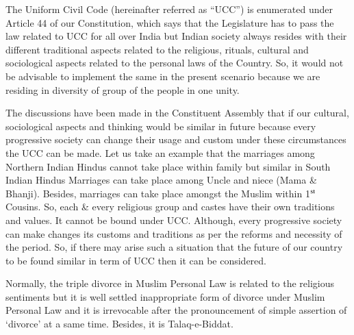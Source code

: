 \setcounter{figure}{0}
\setcounter{table}{0}
\setcounter{footnote}{0}




\begin{multicols}{2}


\noi
The Uniform Civil Code (hereinafter referred as “UCC”) is enumerated under Article 44 of
our Constitution, which says that the Legislature has to pass the law related to UCC for all
over India but Indian society always resides with their different traditional aspects related to
the religious, rituals, cultural and sociological aspects related to the personal laws of the
Country. So, it would not be advisable to implement the same in the present scenario because
we are residing in diversity of group of the people in one unity.

\vspace{-.1cm}

\noi
The discussions have been made in the Constituent Assembly that if our cultural, sociological
aspects and thinking would be similar in future because every progressive society can change
their usage and custom under these circumstances the UCC can be made. Let us take an
example that the marriages among Northern Indian Hindus cannot take place within family
but similar in South Indian Hindus Marriages can take place among Uncle and niece (Mama
\& Bhanji). Besides, marriages can take place amongst the Muslim within 1$^{\rm st}$ Cousins. So,
each \& every religious group and castes have their own traditions and values. It cannot be
bound under UCC. Although, every progressive society can make changes its customs and
traditions as per the reforms and necessity of the period. So, if there may arise such a
situation that the future of our country to be found similar in term of UCC then it can be
considered.

\vspace{-.1cm}

\noi
Normally, the triple divorce in Muslim Personal Law is related to the religious sentiments but
it is well settled inappropriate form of divorce under Muslim Personal Law and it is
irrevocable after the pronouncement of simple assertion of ‘divorce’ at a same time. Besides,
it is Talaq-e-Biddat.


\end{multicols}

